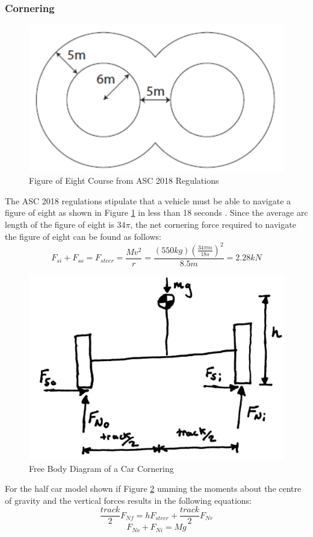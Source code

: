 \documentclass[12pt]{article}
\begin{document}
\subsubsection{Cornering}
\begin{figure}[h!]
	\centering
	\includegraphics[width=.5\textwidth]{./LaTex/dynamicScrutineering.PNG}
	\caption{Figure of Eight Course from ASC 2018 Regulations 
	\cite{ASC2018regs}}
	\label{fig:dynamicScrutineering}
\end{figure}
The ASC 2018 regulations stipulate that a vehicle must be able to navigate a figure of eight as shown in Figure \ref{fig:dynamicScrutineering} in less than 18 seconds \cite{ASC2018regs}. Since the average arc length of the figure of eight is $34\pi$, the net cornering force required to navigate the figure of eight can be found as follows:
\begin{equation}
	F_{si} + F_{so} = F_{steer} = \frac{Mv^2}{r} = \frac{(550kg)\left(\frac{34\pi m}{18s}\right)^2}{8.5m} = 2.28kN
\end{equation}
\begin{figure}[h!]
	\centering
	\includegraphics[width=.5\textwidth]{./LaTex/steerFBD.jpg}
	\caption{Free Body Diagram of a Car Cornering}
	\label{fig:steerFBD}
\end{figure}
For the half car model shown if Figure \ref{fig:steerFBD} umming the moments about the centre of gravity and the vertical forces results in the following equations: 
\begin{equation}
	\frac{track}{2}F_{Nf} = hF_{steer} + \frac{track}{2}F_{Nr}
\end{equation}
\begin{equation}
	F_{No} + F_{Ni} = Mg
\end{equation}
\end{document}

